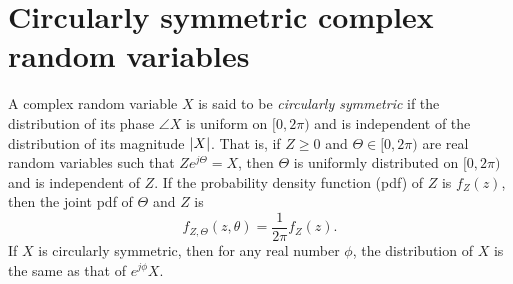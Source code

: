 \documentclass[conference]{IEEEtran}
\begin{document}



\section{Circularly symmetric complex random variables}\label{sec:circ-symm-compl}

A complex random variable $X$ is said to be \emph{circularly symmetric} if the distribution of its phase $\angle{X}$ is uniform on $[0,2\pi)$ and is independent of the distribution of its magnitude ${\left\vert X \right\vert}$.  That is, if $Z \geq 0$ and $\Theta \in [0,2\pi)$ are real random variables such that $Ze^{j\Theta} = X$, then $\Theta$ is uniformly distributed on $[0,2\pi)$ and is independent of $Z$.  If the probability density function (pdf) of $Z$ is $f_Z(z)$, then the joint pdf of $\Theta$ and $Z$ is 
\[
f_{Z,\Theta}(z,\theta) = \frac{1}{2\pi}f_Z(z).
\]  
If $X$ is circularly symmetric, then for any real number $\phi$, the distribution of $X$ is the same as that of $e^{j\phi}X$.  %
\end{document}
